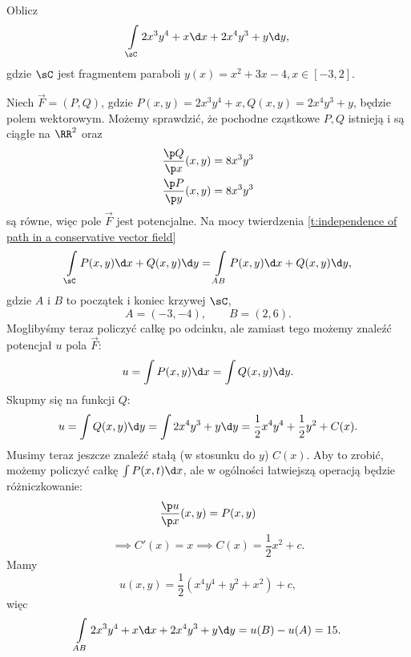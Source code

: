 \begin{example}
    Oblicz
    \[ \int\limits_\sC 2x^3y^4 + x \d x + 2x^4y^3 + y \d y, \]
    gdzie $\sC$ jest fragmentem paraboli $y(x) = x^2 + 3x - 4, x \in [-3, 2]$.
\end{example}
\begin{solution}
    Niech $\vec{F} = (P, Q)$, gdzie $P(x, y) = 2x^3y^4 + x, Q(x, y) = 2x^4y^3 + y$, będzie polem wektorowym. Możemy sprawdzić, że pochodne cząstkowe $P, Q$ istnieją i są ciągłe na $\RR^2$ oraz
    \begin{align*}
        \frac{\p Q}{\p x}(x, y) &= 8x^3y^3 \\
        \frac{\p P}{\p y}(x, y) &= 8x^3y^3
    \end{align*}
    są równe, więc pole $\vec{F}$ jest potencjalne. Na mocy twierdzenia \ref{t:independence of path in a conservative vector field}
    \[ \int\limits_\sC P(x, y) \d x + Q(x, y) \d y = \int\limits_{AB} P(x, y) \d x + Q(x, y) \d y, \]
    gdzie $A$ i $B$ to początek i koniec krzywej $\sC$,
    \[ A = (-3, -4), \qquad B = (2, 6). \]
    Moglibyśmy teraz policzyć całkę po odcinku, ale zamiast tego możemy znaleźć potencjał $u$ pola $\vec{F}$:
    \[ u = \int P(x, y) \d x = \int Q(x, y) \d y. \]
    Skupmy się na funkcji $Q$:
    \[ u = \int Q(x, y) \d y = \int 2x^4y^3 + y \d y = \frac{1}{2}x^4y^4 + \frac{1}{2}y^2 + C(x). \]
    Musimy teraz jeszcze znaleźć stałą (w stosunku do $y$) $C(x)$. Aby to zrobić, możemy policzyć całkę $\int P(x, t) \d x$, ale w ogólności łatwiejszą operacją będzie różniczkowanie:
    \[ \frac{\p u}{\p x}(x, y) = P(x, y) \]
    \[ \implies C'(x) = x  \implies C(x) = \frac{1}{2}x^2 + c. \]
    Mamy
    \[ u(x, y) = \frac{1}{2}\left(x^4y^4 + y^2 + x^2\right) + c, \]
    więc
    \[ \int\limits_{AB} 2x^3y^4 + x \d x + 2x^4y^3 + y \d y = u(B) - u(A) = 15. \]
\end{solution}